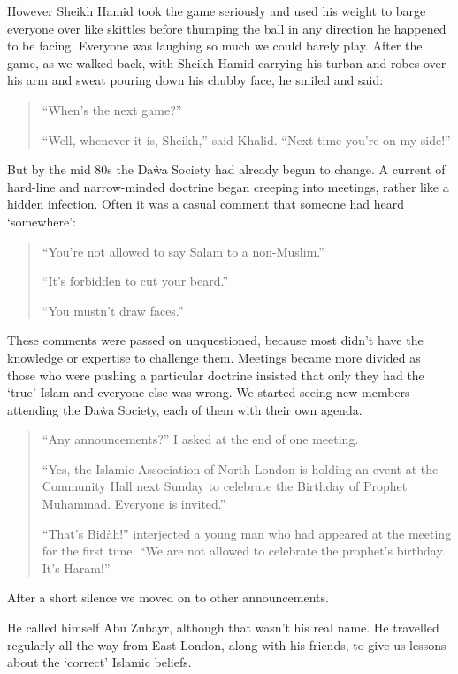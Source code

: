 \documentclass[12pt]{memoir}
\begin{document}
However Sheikh Hamid took the game seriously
and used his weight to barge everyone over like skittles
before thumping the ball in any direction he happened to be facing.
Everyone was laughing so much we could barely play.
After the game, as we walked back, with Sheikh Hamid carrying his turban
and robes over his arm and sweat pouring down his chubby face,
he smiled and said:

\begin{quote}
“When’s the next game?”

“Well, whenever it is, Sheikh,” said Khalid.
“Next time you’re on my side!”
\end{quote}

But by the mid 80s the Da\`wa Society had already begun to change.
A current of hard-line and narrow-minded doctrine began creeping into meetings,
rather like a hidden infection.
Often it was a casual comment that someone had heard ‘somewhere’:

\begin{quote}
“You’re not allowed to say Salam to a non-Muslim.”

“It’s forbidden to cut your beard.”

“You mustn’t draw faces.”
\end{quote}

These comments were passed on unquestioned,
because most didn’t have the knowledge or expertise to challenge them.
Meetings became more divided as those who were pushing a particular doctrine
insisted that only they had the ‘true’ Islam and everyone else was wrong.
We started seeing new members attending the Da\`wa Society,
each of them with their own agenda.

\begin{quote}
“Any announcements?” I asked at the end of one meeting.

“Yes, the Islamic Association of North London is holding
an event at the Community Hall next Sunday
to celebrate the Birthday of Prophet Muhammad.
Everyone is invited.”

“That’s Bid\`ah!” interjected a young man
who had appeared at the meeting for the first time.
“We are not allowed to celebrate the prophet’s birthday.
It’s Haram!”
\end{quote}

After a short silence we moved on to other announcements.

He called himself Abu Zubayr, although that wasn’t his real name.
He travelled regularly all the way from East London, along with his friends,
to give us lessons about the ‘correct’ Islamic beliefs.
\end{document}
